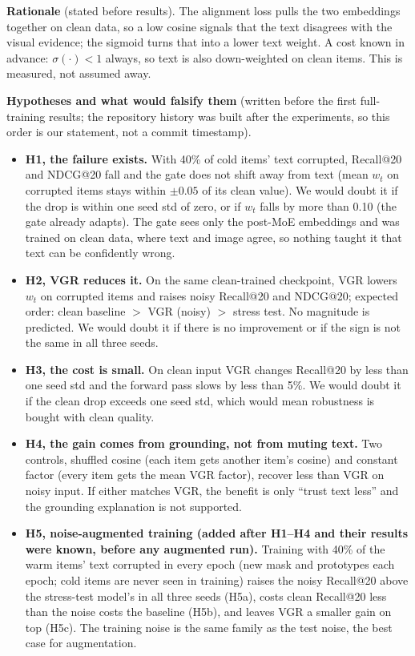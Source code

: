 \documentclass[conference]{IEEEtran}
\begin{document}
\textbf{Rationale} (stated before results). The alignment loss pulls the two embeddings together on clean data, so a low cosine signals that the text disagrees with the visual evidence; the sigmoid turns that into a lower text weight. A cost known in advance: $\sigma(\cdot) < 1$ always, so text is also down-weighted on clean items. This is measured, not assumed away.

\textbf{Hypotheses and what would falsify them} (written before the first full-training results; the repository history was built after the experiments, so this order is our statement, not a commit timestamp).
\begin{itemize}
\item \textbf{H1, the failure exists.} With 40\% of cold items' text corrupted, Recall@20 and NDCG@20 fall and the gate does not shift away from text (mean $w_t$ on corrupted items stays within $\pm0.05$ of its clean value). We would doubt it if the drop is within one seed std of zero, or if $w_t$ falls by more than 0.10 (the gate already adapts). The gate sees only the post-MoE embeddings and was trained on clean data, where text and image agree, so nothing taught it that text can be confidently wrong.
\item \textbf{H2, VGR reduces it.} On the same clean-trained checkpoint, VGR lowers $w_t$ on corrupted items and raises noisy Recall@20 and NDCG@20; expected order: clean baseline $>$ VGR (noisy) $>$ stress test. No magnitude is predicted. We would doubt it if there is no improvement or if the sign is not the same in all three seeds.
\item \textbf{H3, the cost is small.} On clean input VGR changes Recall@20 by less than one seed std and the forward pass slows by less than 5\%. We would doubt it if the clean drop exceeds one seed std, which would mean robustness is bought with clean quality.
\item \textbf{H4, the gain comes from grounding, not from muting text.} Two controls, shuffled cosine (each item gets another item's cosine) and constant factor (every item gets the mean VGR factor), recover less than VGR on noisy input. If either matches VGR, the benefit is only ``trust text less'' and the grounding explanation is not supported.
\item \textbf{H5, noise-augmented training (added after H1--H4 and their results were known, before any augmented run).} Training with 40\% of the warm items' text corrupted in every epoch (new mask and prototypes each epoch; cold items are never seen in training) raises the noisy Recall@20 above the stress-test model's in all three seeds (H5a), costs clean Recall@20 less than the noise costs the baseline (H5b), and leaves VGR a smaller gain on top (H5c). The training noise is the same family as the test noise, the best case for augmentation.

\end{itemize}
\end{document}
